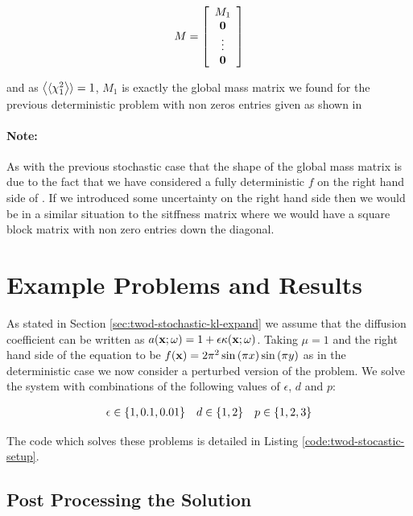 \begin{equation}
    M = \left[\begin{array}{c}
            M_1 \\ \mathbf{0} \\ \vdots \\ \mathbf{0}
    \end{array}\right]
\end{equation}

and as $\left\langle\langle\chi_1^2\right\rangle\rangle = 1$, $M_1$ is exactly the global mass matrix we found
for the previous deterministic problem with non zeros entries given as shown in


\paragraph{Note:}

As with the previous stochastic case that the shape of the global mass matrix
is due to the fact that we have considered a fully deterministic $f$ on the
right hand side of . If we introduced some uncertainty
on the right hand side then we would be in a similar situation to the sitffness
matrix where we would have a square block matrix with non zero entries down the
diagonal.

\section{Example Problems and Results}

As stated in Section \ref{sec:twod-stochastic-kl-expand} we assume that the
diffusion coefficient can be written as $a(\mathbf{x};\omega) = 1 +
\epsilon\kappa(\mathbf{x};\omega)$. Taking $\mu = 1$ and the right hand side of the
equation to be $f(\mathbf{x}) = 2\pi^2\sin{(\pi x)}\sin{(\pi y)}$ as in the
deterministic case we now consider a perturbed version of the problem. We solve
the system with combinations of the following values of $\epsilon$, $d$ and
$p$:

\begin{equation*}
    \begin{array}{c c c}
        \epsilon \in \{1, 0.1, 0.01\} &
        d \in \{1, 2\} &
        p \in \{1, 2, 3\}
    \end{array}
\end{equation*}

The code which solves these problems is detailed in Listing
\ref{code:twod-stocastic-setup}.

\subsection{Post Processing the Solution}

